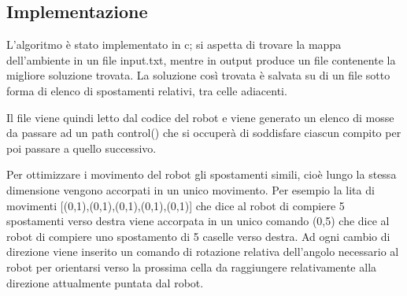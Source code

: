 \documentclass{article}
\begin{document}
\subsection{Implementazione}
L'algoritmo è stato implementato in c; si aspetta di trovare la mappa dell'ambiente in un file input.txt, mentre in output produce un file contenente la migliore soluzione trovata. La soluzione così trovata è salvata su di un file sotto forma di elenco di spostamenti relativi, tra celle adiacenti.

Il file viene quindi letto dal codice del robot e viene generato un elenco di mosse da passare ad un path control() che si occuperà di soddisfare ciascun compito per poi passare a quello successivo.

Per ottimizzare i movimento del robot gli spostamenti simili, cioè lungo la stessa dimensione vengono accorpati in un unico movimento. Per esempio la lita di movimenti [(0,1),(0,1),(0,1),(0,1),(0,1)] che dice al robot di compiere 5 spostamenti verso destra viene accorpata in un unico comando (0,5) che dice al robot di compiere uno spostamento di 5 caselle verso destra.
Ad ogni cambio di direzione viene inserito un comando di rotazione relativa dell'angolo necessario al robot per orientarsi verso la prossima cella da raggiungere relativamente alla direzione attualmente puntata dal robot.
\end{document}
